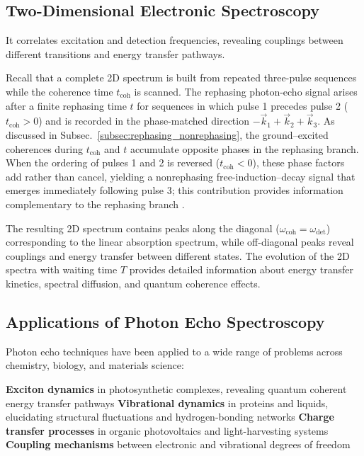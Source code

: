 \subsection{Two-Dimensional Electronic Spectroscopy}
\label{subsec:2d_spectroscopy}

\noindent 
It correlates excitation and detection frequencies, revealing couplings between different transitions and energy transfer pathways.

\noindent 
Recall that a complete 2D spectrum is built from repeated three-pulse sequences while the coherence time $t_{\text{coh}}$ is scanned. The rephasing photon-echo signal arises after a finite rephasing time $t$ for sequences in which pulse 1 precedes pulse 2 ($t_{\text{coh}}>0$) and is recorded in the phase-matched direction $-\vec{k}_1 + \vec{k}_2 + \vec{k}_3$. As discussed in Subsec.~\ref{subsec:rephasing_nonrephasing}, the ground–excited coherences during $t_{\text{coh}}$ and $t$ accumulate opposite phases in the rephasing branch. When the ordering of pulses 1 and 2 is reversed ($t_{\text{coh}}<0$), these phase factors add rather than cancel, yielding a nonrephasing free-induction–decay signal that emerges immediately following pulse 3; this contribution provides information complementary to the rephasing branch \cite{ginsbergetal2009twodimensionalelectronicspectroscopy}.

\noindent The resulting 2D spectrum contains peaks along the diagonal ($\omega_{\text{coh}} = \omega_{\text{det}}$) corresponding to the linear absorption spectrum, while off-diagonal peaks reveal couplings and energy transfer between different states. The evolution of the 2D spectra with waiting time $T$ provides detailed information about energy transfer kinetics, spectral diffusion, and quantum coherence effects.

\subsection{Applications of Photon Echo Spectroscopy}
\label{subsec:echo_applications}

\noindent Photon echo techniques have been applied to a wide range of problems across chemistry, biology, and materials science:

\textbf{Exciton dynamics} in photosynthetic complexes, revealing quantum coherent energy transfer pathways %
\textbf{Vibrational dynamics} in proteins and liquids, elucidating structural fluctuations and hydrogen-bonding networks \cite{hammzanni2011conceptsmethods2d}
\textbf{Charge transfer processes} in organic photovoltaics and light-harvesting systems
\textbf{Coupling mechanisms} between electronic and vibrational degrees of freedom \cite{khaliletal2004vibrationalcoherencetransfer}



